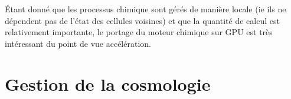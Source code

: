 Étant donné que les processus chimique sont gérés de manière locale (ie ils ne dépendent pas de l'état des cellules voisines) et que la quantité de calcul est relativement importante, le portage du moteur chimique sur \ac{GPU} est très intéressant du point de vue accélération.

\clearpage
\section{Gestion de la cosmologie}
\label{sec:supercomobil}



%
%
%
%

